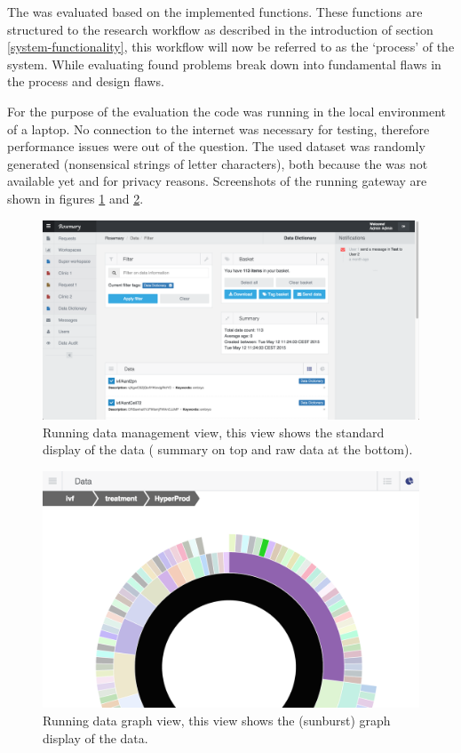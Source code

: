 The \ivfsystem{} was evaluated based on the implemented functions.
These functions are structured to the research workflow as described in the introduction of section \ref{system-functionality}, this workflow will now be referred to as the `process' of the system.
While evaluating found problems break down into fundamental flaws in the process and design flaws.

For the purpose of the evaluation the \ivfsystem{} code was running in the local environment of a laptop.
No connection to the internet was necessary for testing, therefore performance issues were out of the question.
The used dataset was randomly generated (nonsensical strings of letter characters), both because the \projectdata{} was not available yet and for privacy reasons.
Screenshots of the running gateway are shown in figures \ref{fig:standard-view-website} and \ref{fig:sunburst-view-zoom-website}.

\begin{figure}[!b]
	\centering
	\includegraphics[width=1.0\linewidth]{images/standard-view}
	\caption{
		Running \ivfsystem{} data management view, this view shows the standard display of the data (\ie{} summary on top and raw data at the bottom).
	}
	\label{fig:standard-view-website}
\end{figure}

\begin{figure}[ht]
	\centering
	\includegraphics[width=0.7\linewidth]{images/sunburst-closeup}
	\caption{
		Running \ivfsystem{} data graph view, this view shows the (sunburst) graph display of the data.
	}
	\label{fig:sunburst-view-zoom-website}
\end{figure}

